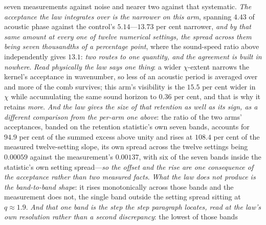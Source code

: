 \documentclass[11pt,a4paper]{article}
\theoremstyle{plain}
\theoremstyle{definition}
\theoremstyle{remark}
\begin{document}
seven measurements against noise and nearer two against that systematic. \emph{The acceptance the law integrates over is the narrower on this
arm}, spanning $4.43$ of acoustic phase against the control's $5.14$---$13.73$ per cent narrower, \emph{and
by that same amount at every one of twelve numerical settings, the spread across them being seven thousandths of
a percentage point}, where the sound-speed ratio above independently gives $13.1$: \emph{two routes to one
quantity, and the agreement is built in nowhere}. \emph{Read physically the law says one thing}: a wider $\chi$-extent narrows the kernel's
acceptance in wavenumber, so less of an acoustic period is averaged over and more of the comb survives; this
arm's visibility is the $15.5$ per cent wider in $\chi$ while accumulating the same sound horizon to $0.36$ per
cent, and that is why it retains
\emph{more}.
\emph{And the law gives the size of that retention as well as its sign, as a different comparison from the
per-arm one above}: the ratio of the two arms' acceptances, banded on the retention statistic's own seven bands,
accounts for $94.9$ per cent of the summed excess above unity and rises at $108.4$ per cent of the measured
twelve-setting slope, its own spread across the twelve settings being $0.00059$ against the measurement's
$0.00137$, with six of the seven bands inside the statistic's own setting spread---\emph{so the offset and the
rise are one consequence of the acceptance rather than two measured facts}. \emph{What the law does not produce
is the band-to-band shape}: it rises monotonically across those bands and the measurement does not, the single
band outside the setting spread sitting at $q\approx1.9$. \emph{And that one band is the step the step
paragraph locates, read at the law's own resolution rather than a second discrepancy}: the lowest of those bands
\end{document}
